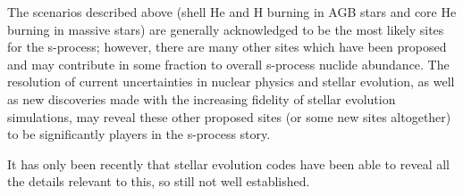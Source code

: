 The scenarios described above (shell He and H burning in AGB stars and
core He burning in massive stars) are generally acknowledged to be the
most likely sites for the s-process; however, there are many other
sites which have been proposed and may contribute in some fraction to
overall s-process nuclide abundance.  The resolution of current
uncertainties in nuclear physics and stellar evolution, as well as new
discoveries made with the increasing fidelity of stellar evolution
simulations, may reveal these other proposed sites (or some new sites
altogether) to be significantly players in the s-process story.


It has only been recently that stellar evolution codes have been able
to reveal all the details relevant to this, so still not well established.
